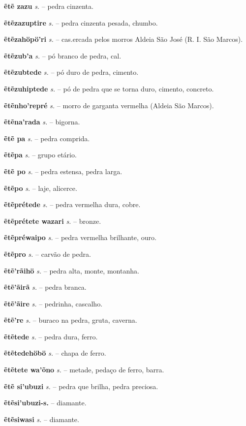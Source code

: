 \textbf{ẽtẽ zazu} \textit{s.} -- pedra cinzenta.

\textbf{ẽtẽzazuptire} \textit{s.} -- pedra cinzenta pesada, chumbo.

\textbf{ẽtẽzahöpö'ri} \textit{s.} -- cas.ercada pelos morros  Aldeia São José (R. I. São Marcos).

\textbf{ẽtẽzub'a} \textit{s.} -- pó branco de pedra, cal.

\textbf{ẽtẽzubtede} \textit{s.} -- pó duro de pedra, cimento.

\textbf{ẽtẽzuhiptede} \textit{s.} -- pó de pedra que se torna duro, cimento, concreto.

\textbf{ẽtẽnho'repré} \textit{s.} -- morro de garganta vermelha (Aldeia São Marcos).

\textbf{ẽtẽna'rada} \textit{s.} -- bigorna.

\textbf{ẽtẽ pa} \textit{s.} -- pedra comprida.

\textbf{ẽtẽpa} \textit{s.} -- grupo etário.

\textbf{ẽtẽ po} \textit{s.} -- pedra estensa, pedra larga.

\textbf{ẽtẽpo} \textit{s.} -- laje, alicerce.

\textbf{ẽtẽprétede} \textit{s.} -- pedra vermelha dura, cobre.

\textbf{ẽtẽprétete wazari} \textit{s.} -- bronze.

\textbf{ẽtẽpréwaipo} \textit{s.} -- pedra vermelha brilhante, ouro.

\textbf{ẽtẽpro} \textit{s.} -- carvão de pedra.

\textbf{ẽtẽ'rãihö} \textit{s.} -- pedra alta, monte, montanha.

\textbf{ẽtẽ'ãirã} \textit{s.} -- pedra branca.

\textbf{ẽtẽ'ãire} \textit{s.} -- pedrinha, cascalho.

\textbf{ẽtẽ're} \textit{s.} -- buraco na pedra, gruta, caverna.

\textbf{ẽtẽtede} \textit{s.} -- pedra dura, ferro.

\textbf{ẽtẽtedehöbö} \textit{s.} -- chapa de ferro.

\textbf{ẽtẽtete wa'õno} \textit{s.} -- metade, pedaço de ferro, barra.

\textbf{ẽtẽ si'ubuzi} \textit{s.} -- pedra que brilha, pedra preciosa.

\textbf{ẽtẽsi'ubuzi-s.} -- diamante.

\textbf{ẽtẽsiwasi} \textit{s.} -- diamante.

